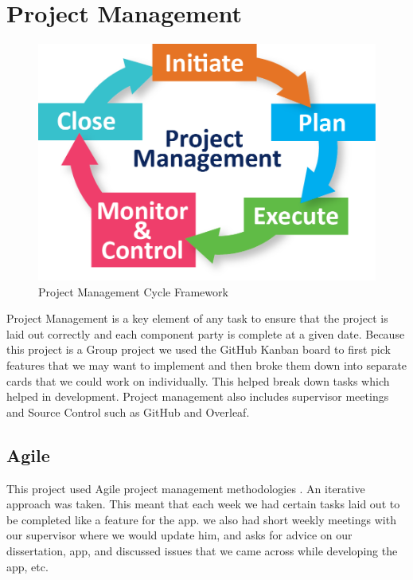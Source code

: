 \section{Project Management}
\begin{figure}[!htb]
    \centering
    \includegraphics[scale=0.45]{img/Project Management Cycle Framework V2.png}
    \caption{Project Management Cycle Framework}
    \label{fig:Project Management Cycle Framework}
\end{figure}
Project Management is a key element of any task to ensure that the project
is laid out correctly and each component party is complete at a given date.
Because this project is a Group project we used the GitHub Kanban board to first pick features that we may want to implement and then broke them down into
separate cards that we could work on individually. This helped break down tasks
which helped in development. Project management also includes supervisor meetings and Source Control such as GitHub and Overleaf.

\subsection{Agile}
This project used Agile project management methodologies \cite{WhatisAg86:online}. An iterative approach was taken. This meant that each week we had certain tasks laid out to
be completed like a feature for the app. we also had short weekly meetings with our supervisor where we would update him,
and asks for advice on our dissertation, app, and discussed issues that we came across while developing the app, etc.

